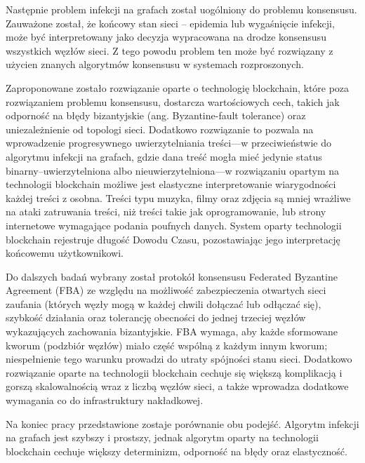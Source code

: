 Następnie problem infekcji na grafach został uogólniony do problemu konsensusu. Zauważone został, że końcowy stan sieci -- epidemia lub wygaśnięcie infekcji, może być interpretowany jako decyzja wypracowana na drodze konsensusu wszystkich węzłów sieci. Z tego powodu problem ten może być rozwiązany z użycien znanych algorytmów konsensusu w systemach rozproszonych.

Zaproponowane zostało rozwiązanie oparte o technologię blockchain, które poza rozwiązaniem problemu konsensusu, dostarcza wartościowych cech, takich jak odporność na błędy bizantyjskie (ang. Byzantine-fault tolerance) oraz uniezależnienie od topologi sieci. Dodatkowo rozwiązanie to pozwala na wprowadzenie progresywnego uwierzytelniania treści––w przeciwieństwie do algorytmu infekcji na grafach, gdzie dana treść mogła mieć jedynie status binarny--uwierzytelniona albo nieuwierzytelniona––w rozwiązaniu opartym na technologii blockchain możliwe jest elastyczne interpretowanie wiarygodności każdej treści z osobna. Treści typu muzyka, filmy oraz zdjęcia są mniej wrażliwe na ataki zatruwania treści, niż treści takie jak oprogramowanie, lub strony internetowe wymagające podania poufnych danych. System oparty technologii blockchain rejestruje długość Dowodu Czasu, pozostawiając jego interpretację końcowemu użytkownikowi.

Do dalszych badań wybrany został protokół konsensusu Federated Byzantine Agreement (FBA) ze względu na możliwość zabezpieczenia otwartych sieci zaufania (których węzły mogą w każdej chwili dołączać lub odłączać się), szybkość działania oraz tolerancję obecności do jednej trzeciej węzłów wykazujących zachowania bizantyjskie. FBA wymaga, aby każde sformowane kworum (podzbiór węzłów) miało część wspólną z każdym innym kworum; niespełnienie tego warunku prowadzi do utraty spójności stanu sieci. Dodatkowo rozwiązanie oparte na technologii blockchain cechuje się większą komplikacją i gorszą skalowalnością wraz z liczbą węzłów sieci, a także wprowadza dodatkowe wymagania co do infrastruktury nakładkowej.

Na koniec pracy przedstawione zostaje porównanie obu podejść. Algorytm infekcji na grafach jest szybszy i prostszy, jednak algorytm oparty na technologii blockchain cechuje większy determinizm, odporność na błędy oraz elastyczność.